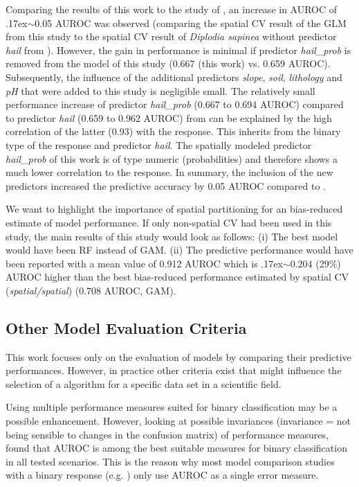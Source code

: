 \documentclass[review]{elsarticle}
\newcommand{\mytilde}{\raise.17ex\hbox{$\scriptstyle\mathtt{\sim}$}}
\begin{document}
Comparing the results of this work to the study of \cite{Iturritxa2014}, an increase in AUROC of \mytilde 0.05 AUROC was observed (comparing the spatial CV result of the GLM from this study to the spatial CV result of \textit{Diplodia sapinea} without predictor \textit{hail} from \cite{Iturritxa2014}).
However, the gain in performance is minimal if predictor \textit{hail\_prob} is removed from the model of this study (0.667 (this work) vs. 0.659 \cite{Iturritxa2014} AUROC).
Subsequently, the influence of the additional predictors \textit{slope}, \textit{soil}, \textit{lithology} and \textit{pH} that were added to this study is negligible small.
The relatively small performance increase of predictor \textit{hail\_prob} (0.667 to 0.694 AUROC) compared to predictor \textit{hail} (0.659 to 0.962 AUROC) from \cite{Iturritxa2014} can be explained by the high correlation of the latter (0.93) with the response.
This inherits from the binary type of the response and predictor \textit{hail}.
The spatially modeled predictor \textit{hail\_prob} of this work is of type numeric (probabilities) and therefore shows a much lower correlation to the response.
In summary, the inclusion of the new predictors increased the predictive accuracy by 0.05 AUROC compared to \cite{Iturritxa2014}.

We want to highlight the importance of spatial partitioning for an bias-reduced estimate of model performance.
If only non-spatial \ac{CV} had been used in this study, the main results of this study would look as follows:
(i) The best model would have been \ac{RF} instead of GAM.
(ii) The predictive performance would have been reported with a mean value of 0.912 AUROC which is \mytilde 0.204 (29\%) AUROC higher than the best bias-reduced performance estimated by spatial \ac{CV} (\emph{spatial/spatial}) (0.708 AUROC, GAM).

\subsection{Other Model Evaluation Criteria}
This work focuses only on the evaluation of models by comparing their predictive performances.
However, in practice other criteria exist that might influence the selection of a algorithm for a specific data set in a scientific field.

Using multiple performance measures suited for binary classification may be a possible enhancement.
However, looking at possible invariances (invariance = not being sensible to changes in the confusion matrix) of performance measures, \cite{Sokolova2009} found that AUROC is among the best suitable measures for binary classification in all tested scenarios.
This is the reason why most model comparison studies with a binary response (e.g. \cite{Goetz2015, Smolinski2016}) only use AUROC as a single error measure.
\end{document}

